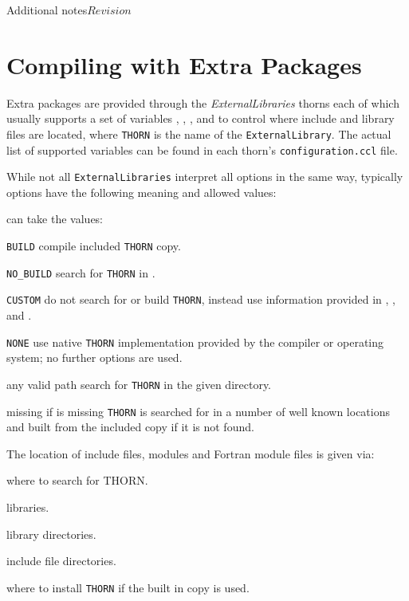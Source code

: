 \begin{cactuspart}{Additional notes}{}{$Revision$}
\begin{itemize}
\end{itemize}




\section{Compiling with Extra Packages}
\label{subsec:cowiexpa}

Extra packages are provided through the \textit{ExternalLibraries} thorns each
of which usually supports a set of variables \texttt{},
\texttt{}, \texttt{}, and
\texttt{} to control where include and library files are
located, where \texttt{THORN} is the name of the \texttt{ExternalLibrary}. The
actual list of supported variables can be found in each thorn's
\texttt{configuration.ccl} file.

While not all \texttt{ExternalLibraries} interpret all options in the same way,
typically options have the following meaning and allowed values:

\texttt{} can take the values:
\begin{Lentry}
\item [\texttt{BUILD}] compile included \texttt{THORN} copy.
\item [\texttt{NO\_BUILD}] search for \texttt{THORN} in
      \texttt{}.
\item [\texttt{CUSTOM}] do not search for or build \texttt{THORN}, instead use
      information provided in \texttt{},
      \texttt{}, and \texttt{}.
\item [\texttt{NONE}] use native \texttt{THORN} implementation provided by the
      compiler or operating system; no further options are used.
\item [any valid path] search for \texttt{THORN} in the given directory.
\item [missing] if \texttt{} is missing \texttt{THORN} is searched for in
      a number of well known locations and built from the included copy if
      it is not found.
\end{Lentry}


The location of include files, modules and Fortran module files is given via:
\begin{Lentry}
\item [\texttt{\var{THORN\_DIR}}] where to search for THORN.
\item [\texttt{\var{THORN\_LIBS}}] libraries.
\item [\texttt{\var{THORN\_LIB\_DIRS}}] library directories.
\item [\texttt{\var{THORN\_INC\_DIRS}}] include file directories.
\item [\texttt{\var{THORN\_INSTALL\_DIR}}] where to install \texttt{THORN} if the
      built in copy is used.
\end{Lentry}


\end{cactuspart}
